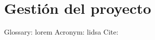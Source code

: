 \chapter{Gestión del proyecto}

\lipsum[1]

Glossary: \gls{lorem} Acronym: \acrshort{lidsa} Cite: \cite{Lorem}
